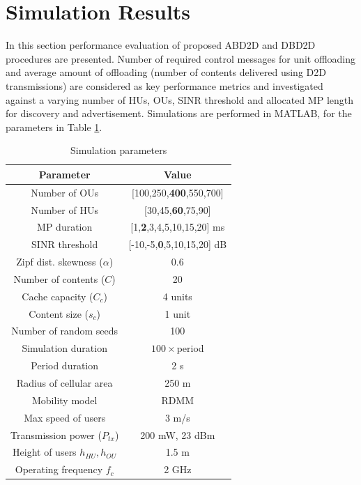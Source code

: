 \documentclass[10pt,a4paper,twocolumn]{article}
\begin{document}
\section{Simulation Results}
\label{sec:sec6}

In this section performance evaluation of proposed ABD2D and DBD2D procedures are presented. Number of required control messages for unit offloading and average amount of offloading (number of contents delivered using D2D transmissions) are considered as key performance metrics and investigated against a varying number of HUs, OUs, SINR threshold and allocated MP length for discovery and advertisement. Simulations are performed in MATLAB, for the parameters in Table \ref{table:simparameters}.

\begin{table}[!htb]
	\small
	\centering
	\caption{Simulation parameters}\label{table:simparameters}
	\begin{tabular}{|c|c|}
		\hline
		\textbf{Parameter} & \textbf{Value} \\\hline
		Number of OUs & [100,250,\textbf{400},550,700] \\\hline
		Number of HUs & [30,45,\textbf{60},75,90] \\\hline
		MP duration  & [1,\textbf{2},3,4,5,10,15,20] ms \\\hline
		SINR threshold & [-10,-5,\textbf{0},5,10,15,20] dB \\\hline
		Zipf dist. skewness ($\alpha$)  &  0.6 \\\hline
		Number of contents ($C$) & 20 \\\hline
		Cache capacity ($C_c$) & 4 units \\\hline
		Content size ($s_c$) & 1 unit \\\hline
		Number of random seeds & 100 \\\hline
		Simulation duration & $100\times$period \\\hline
		Period duration & 2 s \\\hline
		Radius of cellular area & 250 m \\\hline
		Mobility model  & RDMM \\\hline
		Max speed of users  & 3 m/s \\\hline
		Transmission power ($P_{tx}$) & 200 mW, 23 dBm \\\hline
		Height of users $h_{HU},h_{OU}$ & 1.5 m \\\hline
		Operating frequency $f_{c}$ & 2 GHz \\\hline
	\end{tabular}
\end{table}
\end{document}
